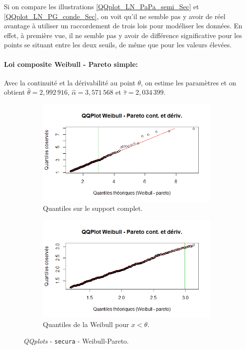 		Si on compare les illustrations \ref{QQplot_LN_PaPa_semi_Sec} et \ref{QQplot_LN_PG_conde_Sec}, on voit qu'il ne semble pas y avoir de réel avantage à utiliser un raccordement de trois lois pour modéliser les données. En effet, à première vue, il ne semble pas y avoir de différence significative pour les points se situant entre les deux seuils, de même que pour les valeurs élevées. 
		
		\paragraph{Loi composite Weibull - Pareto simple:} Avec la continuité et la dérivabilité au point $\theta$, on estime les paramètres et on obtient $\hat{\theta} = 2,992\,916$, $\hat{\alpha} = 3,571\,568$ et $\hat{\tau}= 2,034\,399$.
		\begin{figure}[H]
			\begin{center}
				\begin{subfigure}[b]{0.45\textwidth}
					\includegraphics[scale=0.55]{Graphiques/QQ_Wei_Pa_contderiv_secura} 
					\caption{Quantiles sur le support complet.} \label{QQplot_W_Pa_conde_secura}
				\end{subfigure}
				\begin{subfigure}[b]{0.4\textwidth}
					\includegraphics[scale=0.55]{Graphiques/QQ_Wei_Pa_contderiv_t1_secura} 
					\caption{Quantiles de la Weibull pour $x < \theta$.} \label{QQplot_W_Pa_conde_2_secura}
				\end{subfigure}
				\renewcommand{\figurename}{Illustration}
				\caption{\textit{QQplots} - \texttt{secura} - Weibull-Pareto.}
			\end{center}
		\end{figure}
		

